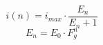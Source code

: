 \documentclass[a4paper,12pt]{article}
\begin{document}
	\begin{equation}
		i(n)= i_{max} \cdot \frac{E_n}{E_n+1}
		\label{eq:current_rotated_units}
	\end{equation}
	\begin{equation}
		E_n= E_0 \cdot F_g ^n
		\label{eq:efficacy_rotated}
	\end{equation}
	

\end{document}
